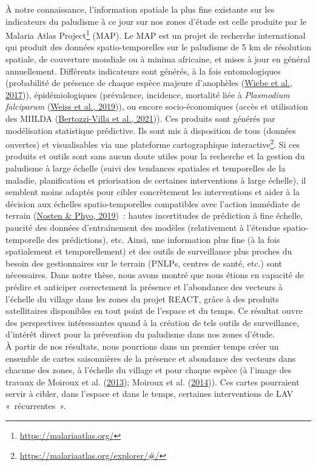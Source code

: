 \documentclass[12pt,twoside]{reedthesis}
\begin{document}
À notre connaissance, l'information spatiale la plus fine existante sur les indicateurs du paludisme à ce jour sur nos zones d'étude est celle produite par le Malaria Atlas Project\footnote{\url{https://malariaatlas.org/}} (MAP). Le MAP est un projet de recherche international qui produit des données spatio-temporelles sur le paludisme de 5 km de résolution spatiale, de couverture mondiale ou à minima africaine, et mises à jour en général annuellement. Différents indicateurs sont générés, à la fois entomologiques (probabilité de présence de chaque espèce majeure d'anophèles (\protect\hyperlink{ref-wiebe_geographical_2017}{Wiebe et al., 2017})), épidémiologiques (prévalence, incidence, mortalité liée à \emph{Plasmodium falciparum} (\protect\hyperlink{ref-weiss_mapping_2019}{Weiss et al., 2019})), ou encore socio-économiques (accès et utilisation des MIILDA (\protect\hyperlink{ref-bertozzi-villa_maps_2021}{Bertozzi-Villa et al., 2021})). Ces produits sont générés par modélisation statistique prédictive. Ils sont mis à disposition de tous (données ouvertes) et visualisables via une plateforme cartographique interactive\footnote{\url{https://malariaatlas.org/explorer/\#/}}. Si ces produits et outils sont sans aucun doute utiles pour la recherche et la gestion du paludisme à large échelle (suivi des tendances spatiales et temporelles de la maladie, planification et priorisation de certaines interventions à large échelle), il semblent moins adaptés pour cibler concrètement les interventions et aider à la décision aux échelles spatio-temporelles compatibles avec l'action immédiate de terrain (\protect\hyperlink{ref-nosten_new_2019}{Nosten \& Phyo, 2019})~: hautes incertitudes de prédiction à fine échelle, paucité des données d'entraînement des modèles (relativement à l'étendue spatio-temporelle des prédictions), etc. Ainsi, une information plus fine (à la fois spatialement et temporellement) et des outils de surveillance plus proches du besoin des gestionnaires sur le terrain (PNLPs, centres de santé, etc.) sont nécessaires. Dans notre thèse, nous avons montré que nous étions en capacité de prédire et anticiper correctement la présence et l'abondance des vecteurs à l'échelle du village dans les zones du projet REACT, grâce à des produits satellitaires disponibles en tout point de l'espace et du temps. Ce résultat ouvre des perspectives intéressantes quand à la création de tels outils de surveillance, d'intérêt direct pour la prévention du paludisme dans nos zones d'étude.\\

À partir de nos résultats, nous pourrions dans un premier temps créer un ensemble de cartes saisonnières de la présence et abondance des vecteurs dans chacune des zones, à l'échelle du village et pour chaque espèce (à l'image des travaux de Moiroux et al. (\protect\hyperlink{ref-moiroux_modelling_2013}{2013}); Moiroux et al. (\protect\hyperlink{ref-moiroux_spatio-temporal_2014}{2014})). Ces cartes pourraient servir à cibler, dans l'espace et dans le temps, certaines interventions de LAV «~récurrentes~».\\
\end{document}
